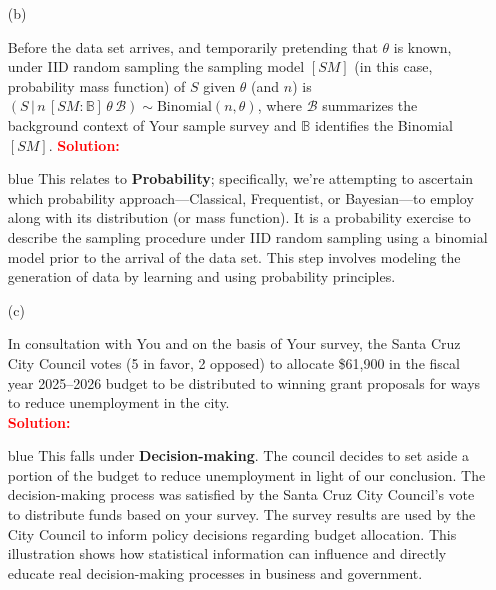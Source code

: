 \documentclass[12pt]{article}
\newcommand{\given}{\, | \,}
\begin{document}
\begin{itemize}
\begin{itemize}
\vspace*{0.6in}

\item[(b)]

Before the data set arrives, and temporarily pretending that $\theta$ is known, under IID random sampling the sampling model $[ SM ]$ (in this case, probability mass function) of $S$ given $\theta$ (and $n$) is $( S \given n \, [ SM \! \! : \mathbb{ B } ] \, \theta \, \mathcal{ B } ) \sim \textrm{Binomial} ( n, \theta )$, where $\mathcal{ B }$ summarizes the background context of Your sample survey and $\mathbb{ B }$ identifies the Binomial $[ SM ]$.
\textbf{\textcolor{red}{Solution:}}
\begin{Solution3}{blue}
    This relates to \textbf{Probability}; specifically, we're attempting to ascertain which probability approach—Classical, Frequentist, or Bayesian—to employ along with its distribution (or mass function). It is a probability exercise to describe the sampling procedure under IID random sampling using a binomial model prior to the arrival of the data set. This step involves modeling the generation of data by learning and using probability principles.
\end{Solution3}

\vspace*{0.6in}

\item[(c)]

In consultation with You and on the basis of Your survey, the Santa Cruz City Council votes (5 in favor, 2 opposed) to allocate \$61,900 in the fiscal year 2025--2026 budget to be distributed to winning grant proposals for ways to reduce unemployment in the city. \\
\textbf{\textcolor{red}{Solution:}}
\begin{Solution3}{blue}
This falls under \textbf{Decision-making}. The council decides to set aside a portion of the budget to reduce unemployment in light of our conclusion. The decision-making process was satisfied by the Santa Cruz City Council's vote to distribute funds based on your survey. The survey results are used by the City Council to inform policy decisions regarding budget allocation. This illustration shows how statistical information can influence and directly educate real decision-making processes in business and government.
\end{Solution3}

\vspace*{0.6in}


\end{itemize}
\end{itemize}
\end{document}
